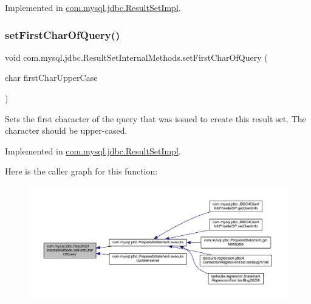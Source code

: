 Implemented in \mbox{\hyperlink{classcom_1_1mysql_1_1jdbc_1_1_result_set_impl_a4fba1e8958a474ee74b88f2356c01d19}{com.\+mysql.\+jdbc.\+Result\+Set\+Impl}}.

\mbox{\label{interfacecom_1_1mysql_1_1jdbc_1_1_result_set_internal_methods_ab6ec147add453fc1d02e0704953a303a}} 
\subsubsection{\texorpdfstring{set\+First\+Char\+Of\+Query()}{setFirstCharOfQuery()}}
{\footnotesize\ttfamily void com.\+mysql.\+jdbc.\+Result\+Set\+Internal\+Methods.\+set\+First\+Char\+Of\+Query (\begin{DoxyParamCaption}\item[{char}]{first\+Char\+Upper\+Case }\end{DoxyParamCaption})}

Sets the first character of the query that was issued to create this result set. The character should be upper-\/cased. 

Implemented in \mbox{\hyperlink{classcom_1_1mysql_1_1jdbc_1_1_result_set_impl_af4fe74c27ee2030bc12bc629f57f944f}{com.\+mysql.\+jdbc.\+Result\+Set\+Impl}}.

Here is the caller graph for this function\+:
\nopagebreak
\begin{figure}[H]
\begin{center}
\leavevmode
\includegraphics[width=350pt]{interfacecom_1_1mysql_1_1jdbc_1_1_result_set_internal_methods_ab6ec147add453fc1d02e0704953a303a_icgraph}
\end{center}
\end{figure}
\mbox{\label{interfacecom_1_1mysql_1_1jdbc_1_1_result_set_internal_methods_aa3a2a0beee0d27ffa2e05935497b0244}} 
